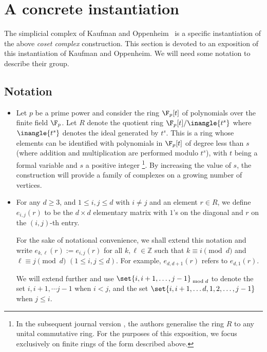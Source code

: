 \documentclass[11pt]{article}
\providecommand{\Z}{\mathbb{Z}}
\begin{document}
\section{A concrete instantiation}

The simplicial complex of Kaufman and Oppenheim~\cite[See STOC version]{KaufmanO2018} is
a specific instantiation of the above \emph{coset complex}
construction. This section is devoted to an exposition of this
instantiation of Kaufman and Oppenheim.  We will need some notation to
describe their group.


\subsection*{Notation}

\begin{itemize}
\item %
  Let $p$ be a prime power and consider the ring $\F_p[t]$ of polynomials
  over the finite field $\F_p$.  %
  Let $R$ denote the
  quotient %
  ring %
  $\F_p[t]/\inangle{t^s}$  %
  where $\inangle{t^s}$ denotes the ideal generated by $t^s$.  %
  This is a ring whose elements can be identified with polynomials in
  $\F_p[t]$ of degree less than $s$ (where addition and multiplication
  are performed modulo $t^s$), with 
%
%
%
%
%
$t$ being a formal variable and $s$ a positive integer%
%
 \footnote{In the subsequent journal version \cite{KaufmanO2018}, the authors generalise
 the ring $R$ to any unital commutative ring. For the %
purposes  %
of this exposition, we focus exclusively on
finite  %
rings of the form described above.}.
%
%
%
%
%
By increasing the value of $s$, the construction will provide a family of complexes
on
a %
growing number of vertices. 
%


\item For any $d\geq 3$, and $1\leq i,j\leq d$ with $i \neq j$ and an
 element $r \in R$,
  we define  $e_{i,j}(r)$ to be the $d\times d$ elementary matrix with $1$'s 
on the diagonal and $r$ on the $(i,j)$-th entry.

For the sake of notational convenience, we shall
%
%
extend this notation 
  and %
write  %
%
%
$e_{k,\ell}(r):=e_{i,j}(r)$ for all $k,\ell\in\Z$ such that 
$k\equiv i\pmod{d}$ and $\ell\equiv j\pmod{d}$ $(1\le i,j\le d)$. %
%
For example, $e_{d,d+1}(r)$ refers to $e_{d,1}(r)$.

%
We will extend further and use $\set{i,i+1, \ldots, j-1}_{\bmod d}$ to denote
the set ${i,i+1, \cdots j-1}$ when $i < j$, and the set 
$\set{i, i+1, \ldots d, 1, 2, \ldots, j-1}$ when $j \leq i$. 
\end{itemize}
\end{document}
